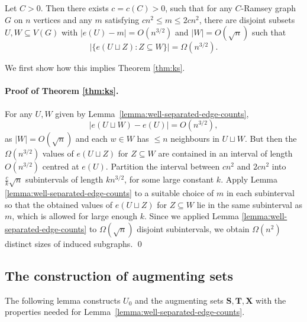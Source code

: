 \begin{lemma}
  \label{lemma:well-separated-edge-counts}

  Let $C > 0$. Then there exists $c = c(C) > 0$, such that for any $C$-Ramsey graph $G$ on $n$ vertices and any $m$ satisfying $cn^2 \leq m \leq 2cn^2$, there are disjoint subsets $U, W \subseteq V(G)$ with $|e(U) - m| = O(n^{3/2})$ and $|W| = O(\sqrt{n})$ such that 
  \[
    \left|\bigl\{e(U \sqcup Z) : Z \subseteq W\bigr\}\right| = \Omega(n^{3/2}).
  \]
\end{lemma}

We first show how this implies Theorem \ref{thm:ks}.

\paragraph{Proof of Theorem \ref{thm:ks}.} For any $U, W$ given by Lemma~\ref{lemma:well-separated-edge-counts},
\[
  |e(U \sqcup W) - e(U)| = O(n^{3/2}),
\]
as $|W| = O(\sqrt{n})$ and each $w \in W$ has $\leq n$ neighbours in $U \sqcup W$. But then the $\Omega(n^{3/2})$ values of $e(U \sqcup Z)$ for $Z \subseteq W$ are contained in an interval of length $O(n^{3/2})$ centred at $e(U)$. Partition the interval between $cn^2$ and $2cn^2$ into $\frac{c}{k}\sqrt{n}$ subintervals of length $kn^{3/2}$, for some large constant $k$. Apply Lemma \ref{lemma:well-separated-edge-counts} to a suitable choice of $m$ in each subinterval so that the obtained values of $e(U \sqcup Z)$ for $Z \subseteq W$ lie in the same subinterval as $m$, which is allowed for large enough $k$. Since we applied Lemma \ref{lemma:well-separated-edge-counts} to $\Omega(\sqrt{n})$ disjoint subintervals, we obtain $\Omega(n^2)$ distinct sizes of induced subgraphs. \qed

\subsection{The construction of augmenting sets}
\label{sec:construction}

The following lemma constructs $U_0$ and the augmenting sets $\mathbf{S}, \mathbf{T}, \mathbf{X}$ with the properties needed for Lemma~\ref{lemma:well-separated-edge-counts}.

